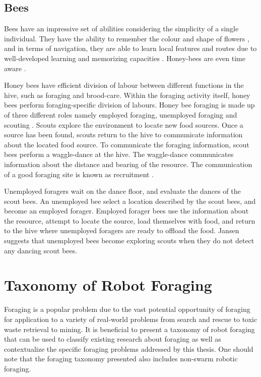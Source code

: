 \subsection{Bees}
\label{bees:biologicalinspiration}
Bees have an impressive set of abilities considering the simplicity of a single individual. They have the ability to remember the colour and shape of flowers \cite{zhang2006honeybee}, and in terms of navigation, they are able to learn local features and routes due to well-developed learning and memorizing capacities \cite{menzel2001cognitive}. Honey-bees are even time aware \cite{moore1989influence}. 

Honey bees have efficient division of labour between different functions in the hive, such as foraging and brood-care. Within the foraging activity itself, honey bees perform foraging-specific division of labours. Honey bee foraging is made up of three different roles namely employed foraging, unemployed foraging and scouting \cite{seeley2009wisdom}. Scouts explore the environment to locate new food sources. Once a source has been found, scouts return to the hive to communicate information about the located food source. To communicate the foraging information, scout bees perform a waggle-dance at the hive. The waggle-dance communicates information about the distance and bearing of the resource. The communication of a good foraging site is known as recruitment \cite{seeley2009wisdom}.

Unemployed foragers wait on the dance floor, and evaluate the dances of the scout bees. An unemployed bee select a location described by the scout bees, and become an employed forager. Employed forager bees use the information about the resource, attempt to locate the source, load themselves with food, and return to the hive where unemployed foragers are ready to offload the food. Jansen \cite{janson2007searching} suggests that unemployed bees become exploring scouts when they do not detect any dancing scout bees. 

\section{Taxonomy of Robot Foraging}
\label{sec:second:types}

Foraging is a popular problem due to the vast potential opportunity of foraging for application to a variety of real-world problems from search and rescue \cite{jennings1997cooperative} to toxic waste retrieval to mining. It is beneficial to present a taxonomy of robot foraging that can be used to classify existing research about foraging as well as contextualize the specific foraging problems addressed by this thesis. One should note that the foraging taxonomy presented also includes non-swarm robotic foraging.

